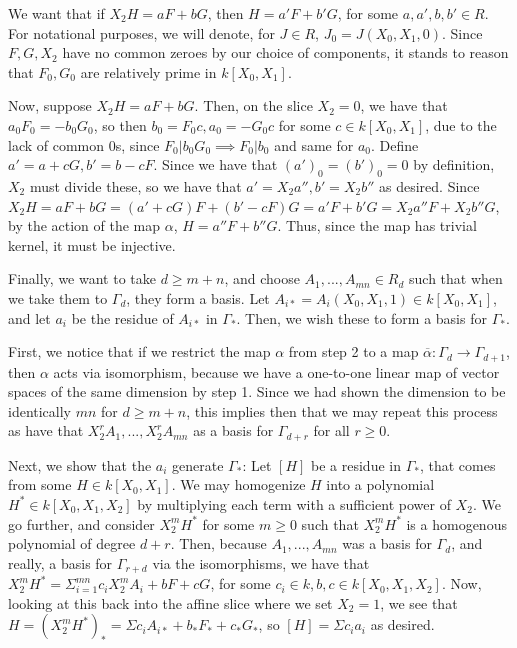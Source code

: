 \documentclass[10pt]{article}
\begin{document}
We want that if $X_2 H = aF + bG$, then $H = a'F + b'G$, for some $a,a',b,b' \in R$. For notational purposes, we will denote, for $J \in R$, $J_0 = J(X_0, X_1, 0)$. Since $F,G, X_2$ have no common zeroes by our choice of components, it stands to reason that $F_0, G_0$ are relatively prime in $k[X_0,X_1]$.

Now, suppose $X_2 H = aF + bG$. Then, on the slice $X_2 = 0$, we have that $a_0F_0 = - b_0 G_0$, so then $b_0 = F_0c, a_0 = -G_0c$ for some $c \in k[X_0,X_1]$, due to the lack of common 0s, since $F_0 | b_0 G_0 \implies F_0 | b_0$ and same for $a_0$. Define $a' = a  +cG, b' = b - cF$. Since we have that $(a')_0 = (b')_0 = 0$ by definition, $X_2$ must divide these, so we have that $a' = X_2 a'', b' = X_2 b''$ as desired. Since $X_2 H = aF + bG = (a'+cG)F + (b'-cF)G = a'F + b'G = X_2 a''F + X_2 b''G$, by the action of the map $\alpha$, $H = a''F + b''G$. Thus, since the map has trivial kernel, it must be injective.

Finally, we want to take $d \geq m + n$, and choose $A_1,...,A_{mn} \in R_d$ such that when we take them to $\Gamma_d$, they form a basis. Let $A_{i*} = A_i(X_0,X_1,1) \in k[X_0,X_1]$, and let $a_i$ be the residue of $A_{i*}$ in $\Gamma_*$. Then, we wish these to form a basis for $\Gamma_*$.

First, we notice that if we restrict the map $\alpha$ from step 2 to a map $\overline{\alpha}: \Gamma_d \to \Gamma_{d+1}$, then $\alpha$ acts via isomorphism, because we have a one-to-one linear map of vector spaces of the same dimension by step 1. Since we had shown the dimension to be identically $mn$ for $d \geq m +n$, this implies then that we may repeat this process as have that $X_2^r A_1,...,X_2^r A_{mn}$ as a basis for  $\Gamma_{d+r}$ for all $r \geq 0$.

Next, we show that the $a_i$ generate $\Gamma_*$: Let $[H]$ be a residue in $\Gamma_*$, that comes from some $H \in k[X_0,X_1]$. We may homogenize $H$ into a polynomial $H^* \in k[X_0,X_1,X_2]$ by multiplying each term with a sufficient power of $X_2$. We go further, and consider $X_2^m H^*$ for some $m \geq 0$ such that $X_2^m H^*$ is a homogenous polynomial of degree $d + r$. Then, because $A_1,... ,A_{mn}$ was a basis for $\Gamma_d$, and really, a basis for $\Gamma_{r + d}$ via the isomorphisms, we have that $X_2^m H^* = \Sigma_{i=1}^{mn} c_i X_2^m A_i + bF + cG$, for some $c_i \in k, b,c \in k[X_0,X_1,X_2]$. Now, looking at this back into the affine slice where we set $X_2 = 1$, we see that $H = (X_2^m H^*)_* = \Sigma c_i A_{i*} + b_* F_* + c_* G_*$, so $[H] = \Sigma c_i a_i$ as desired. 
\end{document}
